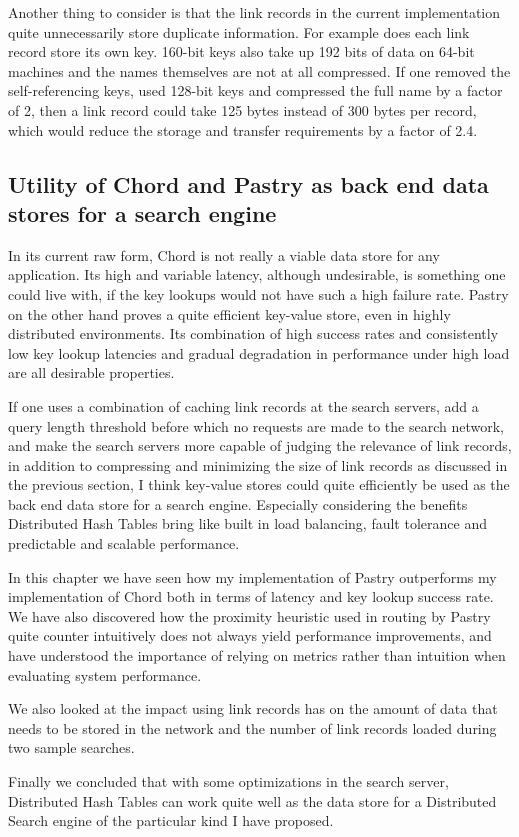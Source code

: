 Another thing to consider is that the link records in the current implementation quite unnecessarily store duplicate information. For example does each link record store its own key. 160-bit keys also take up 192 bits of data on 64-bit machines and the names themselves are not at all compressed.
If one removed the self-referencing keys, used 128-bit keys and compressed the full name by a factor of 2, then a link record could take 125 bytes instead of 300 bytes per record, which would reduce the storage and transfer requirements by a factor of 2.4. 


\subsection{Utility of Chord and Pastry as back end data stores for a search engine}
In its current raw form, Chord is not really a viable data store for any application. Its high and variable latency, although undesirable, is something one could live with, if the key lookups would not have such a high failure rate.
Pastry on the other hand proves a quite efficient key-value store, even in highly distributed environments. Its combination of high success rates and consistently low key lookup latencies and gradual degradation in performance under high load are all desirable properties.

If one uses a combination of caching link records at the search servers, add a query length threshold before which no requests are made to the search network, and make the search servers more capable of judging the relevance of link records, in addition to compressing and minimizing the size of link records as discussed in the previous section, I think key-value stores could quite efficiently be used as the back end data store for a search engine. Especially considering the benefits Distributed Hash Tables bring like built in load balancing, fault tolerance and predictable and scalable performance.

\mbox{}

In this chapter we have seen how my implementation of Pastry outperforms my implementation of Chord both in terms of latency and key lookup success rate.
We have also discovered how the proximity heuristic used in routing by Pastry quite counter intuitively does not always yield performance improvements, and have understood the importance of relying on metrics rather than intuition when evaluating system performance.

We also looked at the impact using link records has on the amount of data that needs to be stored in the network and the number of link records loaded during two sample searches.

Finally we concluded that with some optimizations in the search server, Distributed Hash Tables can work quite well as the data store for a Distributed Search engine of the particular kind I have proposed.
